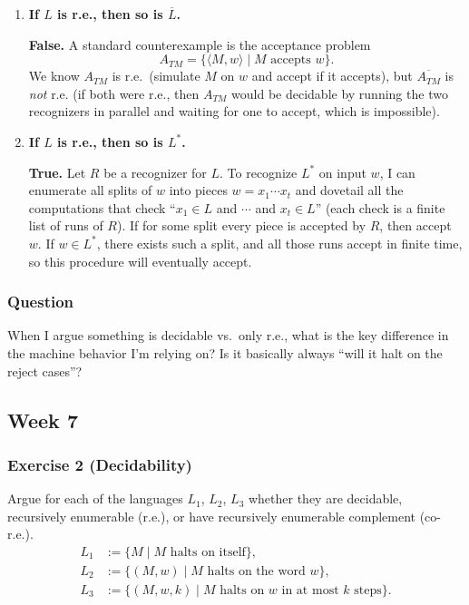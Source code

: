 \documentclass{article}
\theoremstyle{theorem}
\theoremstyle{definition}
\theoremstyle{remark}
\begin{document}
\begin{enumerate}
  \item \textbf{If $L$ is r.e., then so is $\overline{L}$.}
  
  \textbf{False.} A standard counterexample is the acceptance problem
  \[
  A_{TM} = \{ \langle M,w\rangle \mid M \text{ accepts } w\}.
  \]
  We know $A_{TM}$ is r.e.\ (simulate $M$ on $w$ and accept if it accepts), but $\overline{A_{TM}}$ is \emph{not} r.e. (if both were r.e., then $A_{TM}$ would be decidable by running the two recognizers in parallel and waiting for one to accept, which is impossible).
  
  \item \textbf{If $L$ is r.e., then so is $L^*$.}
  
  \textbf{True.} Let $R$ be a recognizer for $L$. To recognize $L^*$ on input $w$, I can enumerate all splits of $w$ into pieces $w = x_1 \cdots x_t$ and dovetail all the computations that check ``$x_1 \in L$ and $\cdots$ and $x_t \in L$'' (each check is a finite list of runs of $R$). If for some split every piece is accepted by $R$, then accept $w$. If $w \in L^*$, there exists such a split, and all those runs accept in finite time, so this procedure will eventually accept.
\end{enumerate}

\subsubsection*{Question}
When I argue something is decidable vs.\ only r.e., what is the key difference in the machine behavior I'm relying on? Is it basically always ``will it halt on the reject cases''?

\subsection{Week 7}\label{sec:week7}

\subsubsection*{Exercise 2 (Decidability)}
Argue for each of the languages $L_1$, $L_2$, $L_3$ whether they are decidable, recursively enumerable (r.e.), or have recursively enumerable complement (co-r.e.).
\begin{align*}
L_1 &:= \{ M \mid \text{$M$ halts on itself} \}, \\
L_2 &:= \{ (M,w) \mid \text{$M$ halts on the word $w$} \}, \\
L_3 &:= \{ (M,w,k) \mid \text{$M$ halts on $w$ in at most $k$ steps} \}.
\end{align*}
\end{document}
